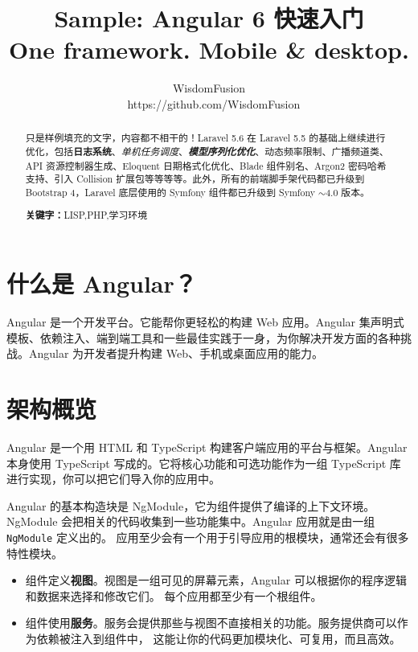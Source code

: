 \documentclass{progartcn}
\title{\bfseries\sffamily
  Sample: Angular 6 快速入门\\
  \normalfont\zihao{-3}
  One framework. Mobile \& desktop.
}
\author{WisdomFusion \\ \faGithubAlt~ https://github.com/WisdomFusion}
\date{}
\begin{document}
\sloppy %


\maketitle
\thispagestyle{empty}


\begin{abstract}
\noindent 只是样例填充的文字，内容都不相干的！Laravel 5.6 在 Laravel 5.5 的基础上继续进行优化，包括\textbf{日志系统}、\textit{单机任务调度}、\textbf{\textit{模型序列化优化}}、动态频率限制、广播频道类、API 资源控制器生成、Eloquent 日期格式化优化、Blade 组件别名、Argon2 密码哈希支持、引入 Collision 扩展包等等等等。此外，所有的前端脚手架代码都已升级到 Bootstrap 4，Laravel 底层使用的 Symfony 组件都已升级到 Symfony $\sim$4.0 版本。

\vspace{2ex}
\noindent \textbf{关键字：}LISP,\hspace{.5em}PHP,\hspace{.5em}学习环境
\end{abstract}

\section{什么是 Angular？}
\label{newfeatures}

Angular 是一个开发平台。它能帮你更轻松的构建 Web 应用。Angular 集声明式模板、依赖注入、端到端工具和一些最佳实践于一身，为你解决开发方面的各种挑战。Angular 为开发者提升构建 Web、手机或桌面应用的能力。

\section{架构概览}

Angular 是一个用 HTML 和 TypeScript 构建客户端应用的平台与框架。Angular 本身使用 TypeScript 写成的。它将核心功能和可选功能作为一组 TypeScript 库进行实现，你可以把它们导入你的应用中。

Angular 的基本构造块是 NgModule，它为组件提供了编译的上下文环境。 NgModule 会把相关的代码收集到一些功能集中。Angular 应用就是由一组 \verb|NgModule| 定义出的。 应用至少会有一个用于引导应用的根模块，通常还会有很多特性模块。

\begin{itemize}
  \item 组件定义\textbf{视图}。视图是一组可见的屏幕元素，Angular 可以根据你的程序逻辑和数据来选择和修改它们。 每个应用都至少有一个根组件。
  
  \item 组件使用\textbf{服务}。服务会提供那些与视图不直接相关的功能。服务提供商可以作为依赖被注入到组件中， 这能让你的代码更加模块化、可复用，而且高效。
\end{itemize}
\end{document}
